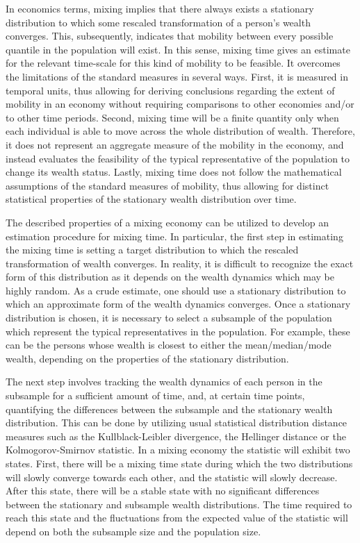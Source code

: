 \documentclass[11pt]{article}
\newcommand{\blue}[1]{{\color{blue} #1}}
\newcommand{\YB}[1]{\blue{{\it YB: #1 YB}}}
\numberwithin{equation}{section}
\begin{document}
In economics terms, mixing implies that there always exists a stationary distribution to which some rescaled transformation of a person's wealth converges. This, subsequently, indicates that mobility between every possible quantile in the population will exist. In this sense, mixing time gives an estimate for the relevant time-scale for this kind of mobility to be feasible. It overcomes the limitations of the standard measures in several ways. First, it is measured in temporal units, thus allowing for deriving conclusions regarding the extent of mobility in an economy without requiring comparisons to other economies and/or to other time periods. Second, mixing time will be a finite quantity only when each individual is able to move across the whole distribution of wealth. Therefore, it does not represent an aggregate measure of the mobility in the economy, and instead evaluates the feasibility of the typical representative of the population to change its wealth status. Lastly, mixing time does not follow the mathematical assumptions of the standard measures of mobility, thus allowing for distinct statistical properties of the stationary wealth distribution over time.



The described properties of a mixing economy can be utilized to develop an estimation procedure for mixing time.
In particular, the first step in estimating the mixing time is setting a target distribution to which the rescaled transformation of wealth converges. In reality, it is difficult to recognize the exact form of this distribution as it depends on the wealth dynamics which may be highly random. As a crude estimate, one should use a stationary distribution to which an approximate form of the wealth dynamics converges. Once a stationary distribution is chosen, it is necessary to select a subsample of the population which represent the typical representatives in the population. For example, these can be the persons whose wealth is closest to either the mean/median/mode wealth, depending on the properties of the stationary distribution.

The next step involves tracking the wealth dynamics of each person in the subsample for a sufficient amount of time, and, at certain time points, quantifying the differences between the subsample and the stationary wealth distribution. This can be done by utilizing usual statistical distribution distance measures such as the Kullblack-Leibler divergence, the Hellinger distance or the Kolmogorov-Smirnov statistic. In a mixing economy the statistic will exhibit two states.  First, there will be a mixing time state during which the two distributions will slowly converge towards each other, and the statistic will slowly decrease. After this state, there will be a stable state with no significant differences between the stationary and subsample wealth distributions. The time required to reach this state and the fluctuations from the expected value of the statistic will depend on both the subsample size and the population size.
\end{document}

